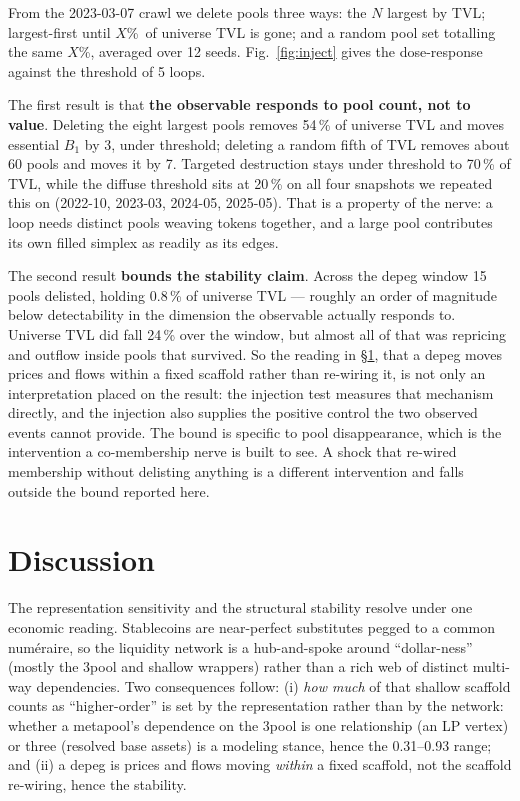 \documentclass[10pt,twocolumn]{article}
\newcommand{\percent}{\%}
\newcommand{\SI}[2]{#1\,#2}
\begin{document}
From the 2023-03-07 crawl we delete pools three ways: the $N$ largest by TVL;
largest-first until $X$\percent\ of universe TVL is gone; and a random pool set totalling
the same $X$\percent, averaged over 12 seeds. Fig.~\ref{fig:inject} gives the
dose-response against the threshold of 5 loops.

The first result is that \textbf{the observable responds to pool count, not to value}.
Deleting the eight largest pools removes \SI{54}{\percent} of universe TVL and moves
essential $B_1$ by 3, under threshold; deleting a random fifth of TVL removes about 60
pools and moves it by 7. Targeted destruction stays under threshold to
\SI{70}{\percent} of TVL, while the diffuse threshold sits at \SI{20}{\percent} on all four
snapshots we repeated this on (2022-10, 2023-03, 2024-05, 2025-05). That is a property of
the nerve: a loop needs distinct pools weaving tokens together, and a large pool
contributes its own filled simplex as readily as its edges.

The second result \textbf{bounds the stability claim}. Across the depeg window 15 pools delisted,
holding \SI{0.8}{\percent} of universe TVL --- roughly an order of magnitude below
detectability in the dimension the observable actually responds to. Universe TVL did fall
\SI{24}{\percent} over the window, but almost all of that was repricing and outflow inside
pools that survived. So the reading in \S\ref{sec:disc}, that a depeg moves prices and
flows within a fixed scaffold rather than re-wiring it, is not only an interpretation
placed on the result: the injection test measures that mechanism directly, and the injection
also supplies the positive control the two observed events cannot provide. The bound is
specific to pool disappearance, which is the intervention a co-membership nerve is built to
see. A shock that re-wired membership without delisting anything is a different
intervention and falls outside the bound reported here.

\section{Discussion}
\label{sec:disc}

The representation sensitivity and the structural stability resolve under one economic
reading. Stablecoins are
near-perfect substitutes pegged to a common numéraire, so the liquidity network is a
hub-and-spoke around ``dollar-ness'' (mostly the 3pool and shallow wrappers) rather than
a rich web of distinct multi-way dependencies. Two consequences follow: (i) \emph{how much}
of that shallow scaffold counts as ``higher-order'' is set by the representation rather
than by the network: whether a metapool's dependence on the 3pool is one relationship (an
LP vertex) or three (resolved base assets) is a modeling stance, hence the 0.31--0.93
range; and
(ii) a depeg is prices and flows moving \emph{within} a fixed scaffold, not the scaffold
re-wiring, hence the stability.
\end{document}
